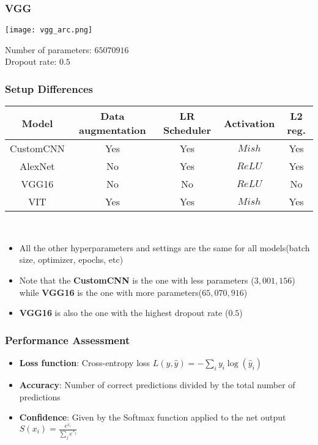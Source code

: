 \documentclass[../presentation.tex]{subfiles} %
\begin{document}
\begin{frame}

    \frametitle{VGG}
    
    \begin{center}
        \hspace*{-0.7cm}
        \texttt{[image: vgg\_arc.png]}
    \end{center}
    
    Number of parameters: $65070916$\\
    Dropout rate: $0.5$
\end{frame}

\begin{frame}
    \frametitle{Setup Differences}
    \hspace*{-0.7cm}
    \begin{tabular}{|c|c|c|c|c|}
        \hline
        \textbf{Model} & \textbf{Data augmentation} &\textbf{LR Scheduler} & \textbf{Activation} & \textbf{L2 reg.} \\
        \hline
        CustomCNN & Yes & Yes & $Mish$ & Yes \\
        AlexNet & No & Yes & $ReLU$ & Yes \\
        VGG16 & No & No & $ReLU$ & No \\
        VIT & Yes & Yes & $Mish$ & Yes \\
        \hline
    \end{tabular}\\
    \vspace{0.5cm}
    \begin{cbox}
        \begin{itemize}
            \item All the other hyperparameters and settings are the same for all models(batch size, optimizer, epochs, etc)
            \item Note that the \textbf{CustomCNN} is the one with less parameters ($3,001,156$) while \textbf{VGG16} is the one with more parameters($65,070,916$)
            \item \textbf{VGG16} is also the one with the highest dropout rate ($0.5$)
        \end{itemize}
    \end{cbox}
\end{frame}

\begin{frame}
    \frametitle{Performance Assessment}
    \begin{itemize}
        \item \textbf{Loss function}: Cross-entropy loss $L(y, \hat{y}) = -\sum_{i} y_i \log(\hat{y}_i)$
        \item \textbf{Accuracy}: Number of correct predictions divided by the total number of predictions
        \item \textbf{Confidence}: Given by the Softmax function applied to the net output $S(x_i) = \frac{e^{x_i}}{\sum_{j} e^{x_j}}$
    \end{itemize}

\end{frame}
\end{document}
